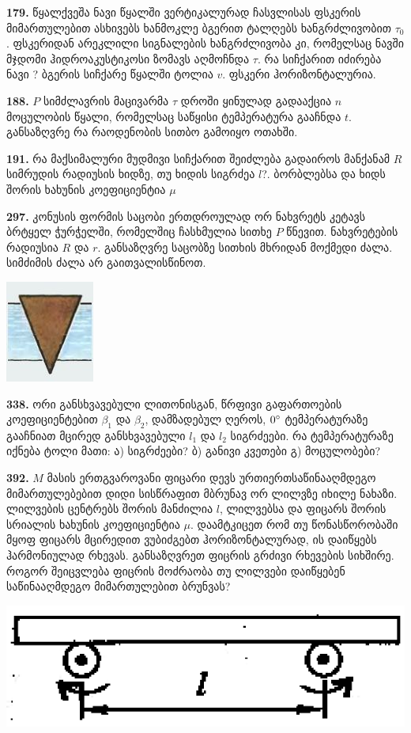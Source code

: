 \documentclass[12pt,a4paper,]{report}
\begin{document}
\textbf{179.} წყალქვეშა ნავი წყალში ვერტიკალურად ჩასვლისას ფსკერის მიმართულებით ასხივებს ხანმოკლე ბგერით ტალღებს ხანგრძლივობით $\tau_0$. ფსკერიდან არეკლილი სიგნალების ხანგრძლივობა კი, რომელსაც ნავში მჯდომი ჰიდროაკუსტიკოსი ზომავს აღმოჩნდა $\tau$. რა სიჩქარით იძირება ნავი ? ბგერის სიჩქარე წყალში ტოლია $v$. ფსკერი ჰორიზონტალურია.

\textbf{188.} $P$ სიმძლავრის მაცივარმა $\tau$ დროში ყინულად გადააქცია $n$ მოცულობის წყალი, რომელსაც საწყისი ტემპერატურა გააჩნდა $t$. განსაზღვრე რა რაოდენობის სითბო გამოიყო ოთახში.

\textbf{191.} რა მაქსიმალური მუდმივი სიჩქარით შეიძლება გადაიროს მანქანამ $R$ სიმრუდის რადიუსის ხიდზე, თუ ხიდის სიგრძეა $l$?. ბორბლებსა და ხიდს შორის ხახუნის კოეფიციენტია $\mu$
 
\textbf{297.} კონუსის ფორმის საცობი ერთდროულად ორ ნახვრეტს კეტავს ბრტყელ ჭურჭელში, რომელშიც ჩასხმულია სითხე $P$ წნევით.  ნახვრეტების რადიუსია $R$ და $r$. განსაზღვრე საცობზე სითხის მხრიდან მოქმედი ძალა. სიმძიმის ძალა არ გაითვალისწინოთ.
		\begin{center}
			\includegraphics[scale=0.5]{images/F297.jpg}
		\end{center}

\textbf{338.} ორი განსხვავებული ლითონისგან, წრფივი გაფართოების კოეფიციენტებით $\beta_1$ და $\beta_2$, დამზადებულ ღეროს, $0\degree$ ტემპერატურაზე გააჩნიათ მცირედ განსხვავებული $l_1$ და $l_2$ სიგრძეები. რა ტემპერატურაზე იქნება ტოლი მათი: ა) სიგრძეები? ბ) განივი კვეთები გ) მოცულობები?

\textbf{392.} $M$ მასის ერთგვაროვანი ფიცარი დევს ურთიერთსაწინააღმდეგო მიმართულებებით დიდი სისწრაფით მბრუნავ ორ ლილვზე იხილე ნახაზი. ლილვების ცენტრებს შორის მანძილია $l$, ლილვებსა და ფიცარს შორის სრიალის ხახუნის კოეფიციენტია $\mu$. დაამტკიცეთ რომ თუ წონასწორობაში მყოფ ფიცარს მცირედით ვუბიძგებთ ჰორიზონტალურად, ის დაიწყებს ჰარმონიულად რხევას. განსაზღვრეთ ფიცრის გრძივი რხევების სიხშირე. როგორ შეიცვლება ფიცრის მოძრაობა თუ ლილვები დაიწყებენ საწინააღმდეგო მიმართულებით ბრუნვას?
	\begin{center}
		\includegraphics[scale=0.4]{images/392}
	\end{center}
\end{document}

